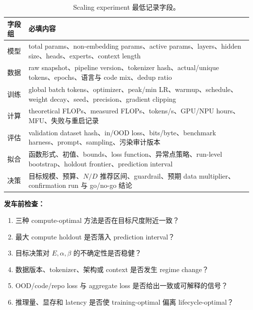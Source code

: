 \documentclass[UTF8,10pt,a4paper,fontset=none]{ctexart}
\begin{document}
\begin{table}[htbp]
\centering
\caption{Scaling experiment 最低记录字段。}\label{tab:schema}
\begin{tabularx}{\textwidth}{p{4.0cm}X}
\toprule
字段组 & 必填内容 \\
\midrule
模型 & total params、non-embedding params、active params、layers、hidden size、heads、experts、context length \\
数据 & raw snapshot、pipeline version、tokenizer hash、actual/unique tokens、epochs、语言与 code mix、dedup ratio \\
训练 & global batch tokens、optimizer、peak/min LR、warmup、schedule、weight decay、seed、precision、gradient clipping \\
计算 & theoretical FLOPs、measured FLOPs、tokens/s、GPU/NPU hours、MFU、失败与重启记录 \\
评估 & validation dataset hash、in/OOD loss、bits/byte、benchmark harness、prompt、sampling、污染审计版本 \\
拟合 & 函数形式、初值、bounds、loss function、异常点策略、run-level bootstrap、holdout frontier、prediction interval \\
决策 & 目标规模、预算、$N/D$ 推荐区间、guardrail、预期 data multiplier、confirmation run 与 go/no-go 结论 \\
\bottomrule
\end{tabularx}
\end{table}

\noindent\textbf{发车前检查：}
\begin{enumerate}
  \item 三种 compute-optimal 方法是否在目标尺度附近一致？
  \item 最大 compute holdout 是否落入 prediction interval？
  \item 目标决策对 $E,\alpha,\beta$ 的不确定性是否稳健？
  \item 数据版本、tokenizer、架构或 context 是否发生 regime change？
  \item OOD/code/repo loss 与 aggregate loss 是否给出一致或可解释的信号？
  \item 推理量、显存和 latency 是否使 training-optimal 偏离 lifecycle-optimal？
\end{enumerate}
\end{document}
